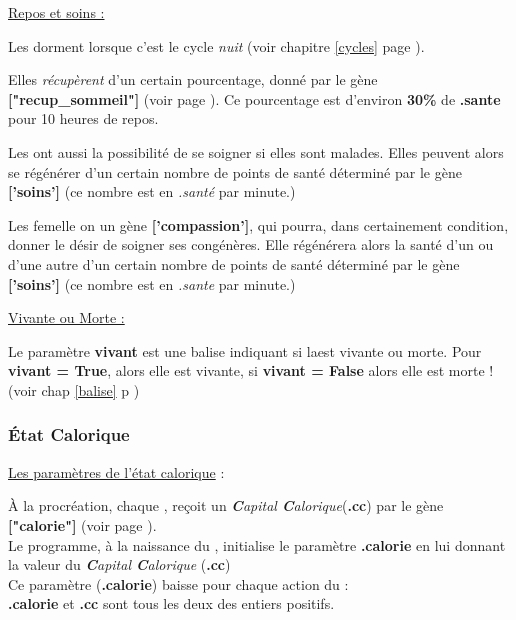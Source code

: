\documentclass[french]{report}
\begin{document}
\begin{center}
	\underline{Repos et soins :}\label{repos}
\end{center}
Les \CoCiX dorment lorsque c'est le cycle \textit{nuit} (voir chapitre \ref{cycles} page \pageref{cycles}).

Elles \textit{récupèrent} d'un certain pourcentage, donné par le gène \textbf{["recup\_sommeil"]} (voir page \pageref{liste_gene}). Ce pourcentage est d'environ \textbf{30\%} de \textbf{.sante} pour 10 heures de repos.

Les \CoCiX ont aussi la possibilité de se soigner si elles sont malades. Elles peuvent alors se régénérer d'un certain nombre de points de santé déterminé par le gène \textbf{['soins']} (ce nombre est en \textit{.santé} par minute.)

Les \CoCiX femelle on un gène \textbf{['compassion']}, qui pourra, dans certainement condition, donner le désir de soigner ses congénères. Elle régénérera alors la santé d'un ou d'une autre \CoCiX d'un certain nombre de points de santé déterminé par le gène \textbf{['soins']} (ce nombre est en \textit{.sante} par minute.)

\begin{center}
	\underline{Vivante ou Morte :}
\end{center}
Le paramètre \textbf{vivant} est une balise indiquant si la\CoCiX est vivante ou morte. Pour \textbf{vivant = True}, alors elle est vivante, si \textbf{vivant = False} alors elle est morte !(voir chap \ref{balise} p \pageref{balise})\\

\subsubsection{État Calorique}\label{alimentation}
\begin{center}
	\underline{Les paramètres de l'état calorique} :\label{cc}
\end{center}
À la procréation, chaque \CoCiX, reçoit un \textit{\textbf{C}apital \textbf{C}alorique}(\textbf{.cc}) par le gène \textbf{["calorie"]} (voir page \pageref{liste_gene}).\\

Le programme, à la naissance du \CoCiX, initialise le paramètre \textbf{.calorie} en lui donnant la valeur du \textit{\textbf{C}apital \textbf{C}alorique} (\textbf{.cc})\\

Ce paramètre (\textbf{.calorie}) baisse pour chaque action du \CoCiX  :\\
\textbf{.calorie} et \textbf{.cc} sont tous les deux des entiers positifs.
\end{document}
